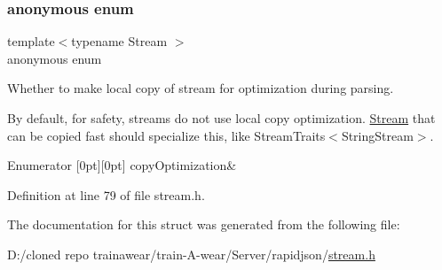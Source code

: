 \subsubsection{\texorpdfstring{anonymous enum}{anonymous enum}}
{\footnotesize\ttfamily template$<$typename Stream $>$ \\
anonymous enum}



Whether to make local copy of stream for optimization during parsing. 

By default, for safety, streams do not use local copy optimization. \mbox{\hyperlink{classrapidjson_1_1_stream}{Stream}} that can be copied fast should specialize this, like Stream\+Traits$<$\+String\+Stream$>$. \begin{DoxyEnumFields}{Enumerator}
[0pt][0pt]{}\mbox{\label{structrapidjson_1_1_stream_traits_aea5a3f90ea4fd2a1b9c9c9954294474daf6f7f81d1e208f1041e618b57e0d3828}} 
copy\+Optimization&\\
\hline

\end{DoxyEnumFields}


Definition at line 79 of file stream.\+h.


\begin{DoxyCode}{0}

\end{DoxyCode}


The documentation for this struct was generated from the following file\+:\begin{DoxyCompactItemize}
\item 
D\+:/cloned repo trainawear/train-\/\+A-\/wear/\+Server/rapidjson/\mbox{\hyperlink{stream_8h}{stream.\+h}}\end{DoxyCompactItemize}
